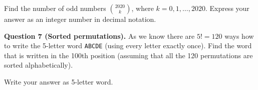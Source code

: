 \documentclass[jou]{apa6}
\begin{document}
Find the number of odd numbers ${2020 \choose k}$, where $k = 0,1,\ldots,2020$. 
Express your answer as an integer number in decimal notation.


\vspace{6pt}
{\bf Question 7 (Sorted permutations).} As we know there are $5! = 120$ ways how to write the 5-letter word
{\tt ABCDE} (using every letter exactly once). Find the word that is written in the 100th position (assuming that
all the 120 permutations are sorted alphabetically).

Write your answer as 5-letter word.
\end{document}

